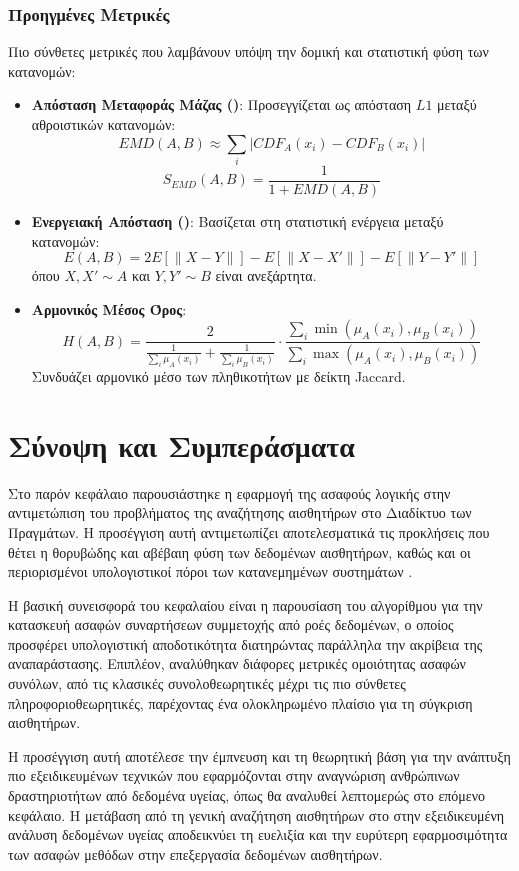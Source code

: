 \subsubsection{Προηγμένες Μετρικές}

Πιο σύνθετες μετρικές που λαμβάνουν υπόψη την δομική και στατιστική φύση των κατανομών:

\begin{itemize}
    \item \textbf{Απόσταση Μεταφοράς Μάζας ()}:
    Προσεγγίζεται ως απόσταση \(L1\) μεταξύ αθροιστικών κατανομών:
    \[EMD(A,B) \approx \sum_{i} |CDF_A(x_i) - CDF_B(x_i)|\]
    \[S_{EMD}(A,B) = \frac{1}{1 + EMD(A,B)}\]
    
    \item \textbf{Ενεργειακή Απόσταση ()}:
    Βασίζεται στη στατιστική ενέργεια μεταξύ κατανομών:
    \[E(A,B) = 2E[\|X-Y\|] - E[\|X-X'\|] - E[\|Y-Y'\|]\]
    όπου \(X,X' \sim A\) και \(Y,Y' \sim B\) είναι ανεξάρτητα.
    
    \item \textbf{Αρμονικός Μέσος Όρος}:
    \[H(A,B) = \frac{2}{\frac{1}{\sum_i \mu_A(x_i)} + \frac{1}{\sum_i \mu_B(x_i)}} \cdot \frac{\sum_i \min(\mu_A(x_i), \mu_B(x_i))}{\sum_i \max(\mu_A(x_i), \mu_B(x_i))}\]
    Συνδυάζει αρμονικό μέσο των πληθικοτήτων με δείκτη Jaccard.
\end{itemize}

\section{Σύνοψη και Συμπεράσματα}

Στο παρόν κεφάλαιο παρουσιάστηκε η εφαρμογή της ασαφούς λογικής στην αντιμετώπιση του προβλήματος της αναζήτησης αισθητήρων στο Διαδίκτυο των Πραγμάτων. 
Η προσέγγιση αυτή αντιμετωπίζει αποτελεσματικά τις προκλήσεις που θέτει η θορυβώδης και αβέβαιη φύση των δεδομένων αισθητήρων, καθώς και οι περιορισμένοι υπολογιστικοί πόροι των κατανεμημένων συστημάτων .

Η βασική συνεισφορά του κεφαλαίου είναι η παρουσίαση του αλγορίθμου  για την κατασκευή ασαφών συναρτήσεων συμμετοχής από ροές δεδομένων, ο οποίος προσφέρει υπολογιστική αποδοτικότητα διατηρώντας παράλληλα την ακρίβεια της αναπαράστασης.
Επιπλέον, αναλύθηκαν διάφορες μετρικές ομοιότητας ασαφών συνόλων, από τις κλασικές συνολοθεωρητικές μέχρι τις πιο σύνθετες πληροφοριοθεωρητικές, παρέχοντας ένα ολοκληρωμένο πλαίσιο για τη σύγκριση αισθητήρων.

Η προσέγγιση αυτή αποτέλεσε την έμπνευση και τη θεωρητική βάση για την ανάπτυξη πιο εξειδικευμένων τεχνικών που εφαρμόζονται στην αναγνώριση ανθρώπινων δραστηριοτήτων από δεδομένα υγείας, όπως θα αναλυθεί λεπτομερώς στο επόμενο κεφάλαιο.
Η μετάβαση από τη γενική αναζήτηση αισθητήρων στο  στην εξειδικευμένη ανάλυση δεδομένων υγείας αποδεικνύει τη ευελιξία και την ευρύτερη εφαρμοσιμότητα των ασαφών μεθόδων στην επεξεργασία δεδομένων αισθητήρων. 
